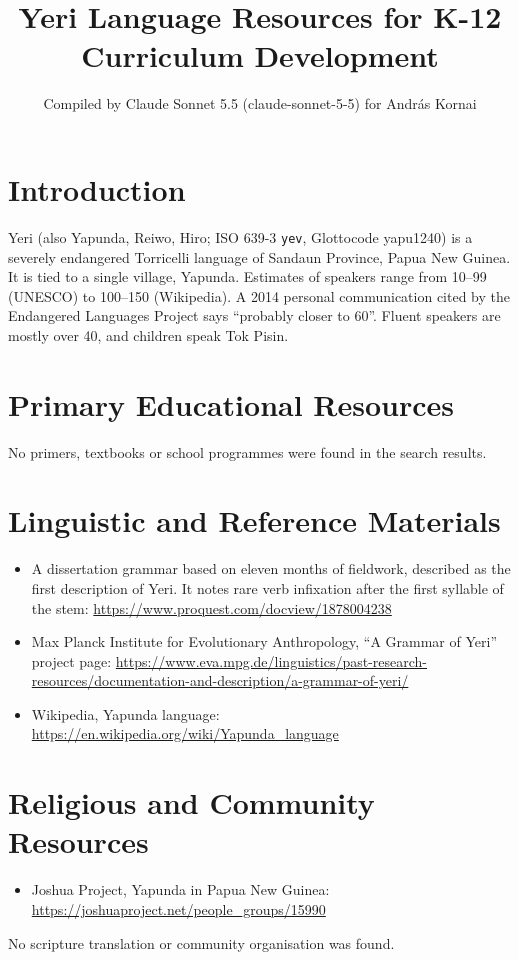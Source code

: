 \documentclass[12pt]{article}
\title{Yeri Language Resources for K-12 Curriculum Development}
\author{Compiled by Claude Sonnet 5.5 (claude-sonnet-5-5) for Andr\'as Kornai}
\date{}
\begin{document}
\maketitle

\section{Introduction}
Yeri (also Yapunda, Reiwo, Hiro; ISO 639-3 \texttt{yev}, Glottocode yapu1240) is a severely endangered Torricelli language of Sandaun Province, Papua New Guinea. It is tied to a single village, Yapunda. Estimates of speakers range from 10--99 (UNESCO) to 100--150 (Wikipedia). A 2014 personal communication cited by the Endangered Languages Project says ``probably closer to 60''. Fluent speakers are mostly over 40, and children speak Tok Pisin.

\section{Primary Educational Resources}
No primers, textbooks or school programmes were found in the search results.

\section{Linguistic and Reference Materials}
\begin{itemize}
\item A dissertation grammar based on eleven months of fieldwork, described as the first description of Yeri. It notes rare verb infixation after the first syllable of the stem: \url{https://www.proquest.com/docview/1878004238}
\item Max Planck Institute for Evolutionary Anthropology, ``A Grammar of Yeri'' project page: \url{https://www.eva.mpg.de/linguistics/past-research-resources/documentation-and-description/a-grammar-of-yeri/}
\item Wikipedia, Yapunda language: \url{https://en.wikipedia.org/wiki/Yapunda_language}
\end{itemize}

\section{Religious and Community Resources}
\begin{itemize}
\item Joshua Project, Yapunda in Papua New Guinea: \url{https://joshuaproject.net/people_groups/15990}
\end{itemize}
No scripture translation or community organisation was found.
\end{document}
